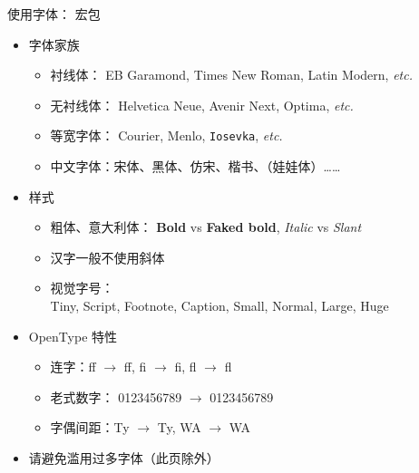 \begin{frame}{使用字体： 宏包}
\begin{itemize}
  \item<1-> 字体家族

    \begin{itemize}
      \item 衬线体：
        {\EBGaramond EB Garamond},
        {\TimesNewRoman Times New Roman},
        {\LatinRomanX Latin Modern}, \emph{etc.}
      \item 无衬线体：
        {\Helvetica Helvetica Neue},
        {\Avenir Avenir Next},
        {\Optima Optima}, \emph{etc.}
      \item 等宽字体：
        {\Courier Courier},
        {\Menlo Menlo},
        \texttt{Iosevka}, \emph{etc.}
      \item 中文字体：宋体、{\HeiTi 黑体}、{\FangSong 仿宋}、{\KaiTi 楷书}、{\WaWa （娃娃体）}……
    \end{itemize}

  \item<2-> 样式

    \begin{itemize}
      \item 粗体、意大利体：
        \textbf{Bold} vs {\textbf{Faked bold}},
        \textit{Italic} vs {\textsl{Slant}}
      \item<3-> \alert{汉字一般不使用斜体}
      \item<4-> 视觉字号：\\
        {\LatinRomanV    Tiny},
        {\LatinRomanVI   Script},
        {\LatinRomanVII  Footnote},
        {\LatinRomanVIII Caption},
        {\LatinRomanIX   Small},
        {\LatinRomanX    Normal},
        {\LatinRomanXII  Large},
        {\LatinRomanXVII Huge}
    \end{itemize}

  \item<5-> OpenType 特性

    \begin{itemize}
      \item 连字：{f}{f} $\to$ ff, {f}{i} $\to$ fi, {f}{l} $\to$ fl
      \item 老式数字：
        0123456789 $\to$ {0123456789}
      \item 字偶间距：{T}{y} $\to$ Ty, {W}{A} $\to$ WA
    \end{itemize}

  \item<6-> \alert{请避免滥用过多字体{\tiny （此页除外）}}
\end{itemize}
\vspace{-0.2cm}
\end{frame}
